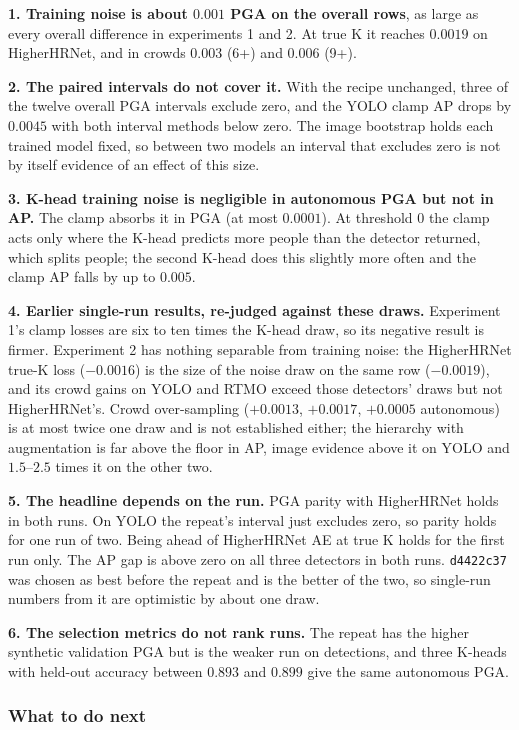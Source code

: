 \textbf{1. Training noise is about $0.001$ PGA on the overall rows}, as large as every overall difference in experiments 1 and 2. At true K it reaches $0.0019$ on HigherHRNet, and in crowds $0.003$ (6+) and $0.006$ (9+).

\textbf{2. The paired intervals do not cover it.} With the recipe unchanged, three of the twelve overall PGA intervals exclude zero, and the YOLO clamp AP drops by $0.0045$ with both interval methods below zero. The image bootstrap holds each trained model fixed, so between two models an interval that excludes zero is not by itself evidence of an effect of this size.

\textbf{3. K-head training noise is negligible in autonomous PGA but not in AP.} The clamp absorbs it in PGA (at most $0.0001$). At threshold 0 the clamp acts only where the K-head predicts more people than the detector returned, which splits people; the second K-head does this slightly more often and the clamp AP falls by up to $0.005$.

\textbf{4. Earlier single-run results, re-judged against these draws.} Experiment 1's clamp losses are six to ten times the K-head draw, so its negative result is firmer. Experiment 2 has nothing separable from training noise: the HigherHRNet true-K loss ($-0.0016$) is the size of the noise draw on the same row ($-0.0019$), and its crowd gains on YOLO and RTMO exceed those detectors' draws but not HigherHRNet's. Crowd over-sampling ($+0.0013$, $+0.0017$, $+0.0005$ autonomous) is at most twice one draw and is not established either; the hierarchy with augmentation is far above the floor in AP, image evidence above it on YOLO and $1.5$--$2.5$ times it on the other two.

\textbf{5. The headline depends on the run.} PGA parity with HigherHRNet holds in both runs. On YOLO the repeat's interval just excludes zero, so parity holds for one run of two. Being ahead of HigherHRNet AE at true K holds for the first run only. The AP gap is above zero on all three detectors in both runs. \texttt{d4422c37} was chosen as best before the repeat and is the better of the two, so single-run numbers from it are optimistic by about one draw.

\textbf{6. The selection metrics do not rank runs.} The repeat has the higher synthetic validation PGA but is the weaker run on detections, and three K-heads with held-out accuracy between $0.893$ and $0.899$ give the same autonomous PGA.

\subsubsection{What to do next}

